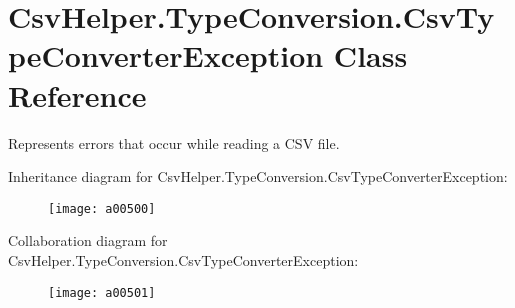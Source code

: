 \hypertarget{a00070}{\section{Csv\-Helper.\-Type\-Conversion.\-Csv\-Type\-Converter\-Exception Class Reference}
\label{a00070}
}


Represents errors that occur while reading a C\-S\-V file.  




Inheritance diagram for Csv\-Helper.\-Type\-Conversion.\-Csv\-Type\-Converter\-Exception\-:
\nopagebreak
\begin{figure}[H]
\begin{center}
\leavevmode
\texttt{[image: a00500]}
\end{center}
\end{figure}


Collaboration diagram for Csv\-Helper.\-Type\-Conversion.\-Csv\-Type\-Converter\-Exception\-:
\nopagebreak
\begin{figure}[H]
\begin{center}
\leavevmode
\texttt{[image: a00501]}
\end{center}
\end{figure}
